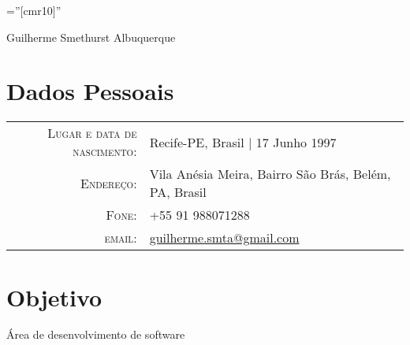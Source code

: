 \documentclass[a4paper,10pt]{article}
\begin{document}
\pagestyle{empty} %

\font\fb=''[cmr10]'' %

\par{\centering
		{\Huge Guilherme Smethurst Albuquerque
	}\bigskip\par}

\section{Dados Pessoais}

\begin{tabular}{rl}
    \textsc{Lugar e data de nascimento:} & Recife-PE, Brasil  | 17 Junho 1997 \\
    \textsc{Endereço:}   & Vila Anésia Meira, Bairro São Brás, Belém, PA, Brasil \\
    \textsc{Fone:}     & +55 91 988071288\\
    \textsc{email:}     &  \href{mailto:guilherme.smta@gmail.com}{guilherme.smta@gmail.com}
\end{tabular}

\section{Objetivo}
Área de desenvolvimento de software

\end{document}

